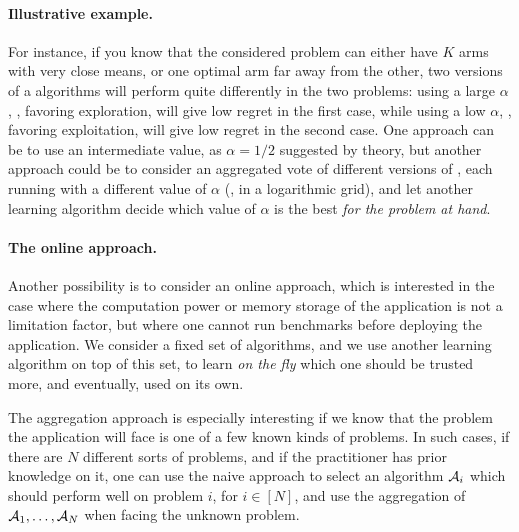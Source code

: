 \paragraph{Illustrative example.}
%
For instance, if you know that the considered problem can either have $K$ arms with very close means, or one optimal arm far away from the other, two versions of a \UCB{} algorithms will perform quite differently in the two problems:
using a large $\alpha$, \ie, favoring exploration, will give low regret in the first case,
while using a low $\alpha$, \ie, favoring exploitation, will give low regret in the second case.
One approach can be to use an intermediate value, as $\alpha=1/2$ suggested by theory, but another approach could be to consider an aggregated vote of different versions of \UCB, each running with a different value of $\alpha$ (\eg, in a logarithmic grid), and let another learning algorithm decide which value of $\alpha$ is the best \emph{for the problem at hand}.

\paragraph{The online approach.}
%
Another possibility is to consider an online approach, which is interested in the case where the computation power or memory storage of the application is not a limitation factor, but where one cannot run benchmarks before deploying the application.
We consider a fixed set of algorithms, and we use another learning algorithm on top of this set, to learn \emph{on the fly} which one should be trusted more, and eventually, used on its own.

The aggregation approach is especially interesting if we know that the problem the application will face is one of a few known kinds of problems.
In such cases, if there are $N$ different sorts of problems, and if the practitioner has prior knowledge on it, one can use the naive approach to select an algorithm $\mathcal{A}_i$ which should perform well on problem $i$, for $i\in[N]$,
and use the aggregation of $\mathcal{A}_1,\dots,\mathcal{A}_N$ when facing the unknown problem.


